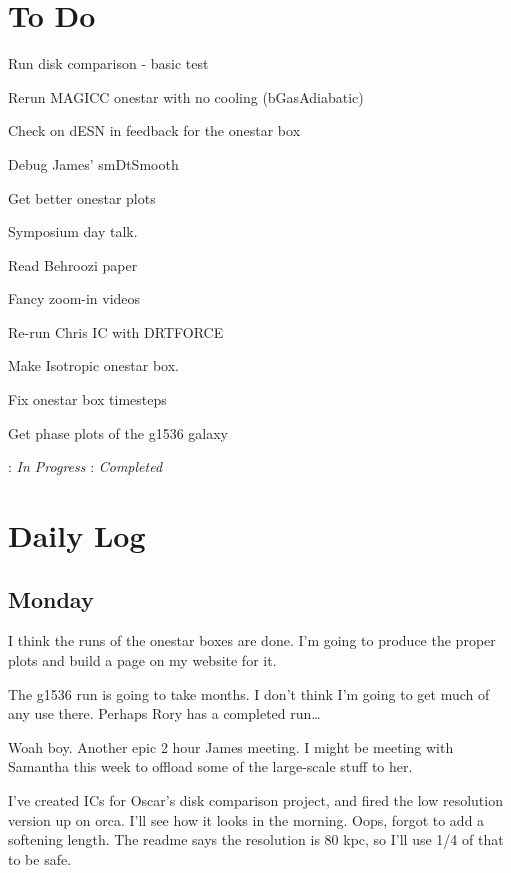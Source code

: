 \documentclass[11pt,letterpaper]{article}
\begin{document}
\section{To Do}
\begin{bullets}
\item[\textleaf] Run disk comparison - basic test
\item[\textleaf] Rerun MAGICC onestar with no cooling (bGasAdiabatic)
\item[\textleaf] Check on dESN in feedback for the onestar box
\item Debug James' smDtSmooth
\item[\checkmark] Get better onestar plots
\item Symposium day talk.
\item Read Behroozi paper
\item[\checkmark] Fancy zoom-in videos
\item[\textleaf] Re-run Chris IC with DRTFORCE
\item Make Isotropic onestar box.
\item Fix onestar box timesteps
\item Get phase plots of the g1536 galaxy
\end{bullets}

\textleaf : \textit{In Progress} \qquad \checkmark : \textit{Completed}
\section{Daily Log}

\subsection{Monday}

I think the runs of the onestar boxes are done. I'm going to produce the
proper plots and build a page on my website for it.

The g1536 run is going to take months. I don't think I'm going to get
much of any use there. Perhaps Rory has a completed run\ldots{}

Woah boy. Another epic 2 hour James meeting. I might be meeting with
Samantha this week to offload some of the large-scale stuff to her.

I've created ICs for Oscar's disk comparison project, and fired the low
resolution version up on orca. I'll see how it looks in the morning.
Oops, forgot to add a softening length. The readme says the resolution
is 80 kpc, so I'll use 1/4 of that to be safe.
\end{document}
